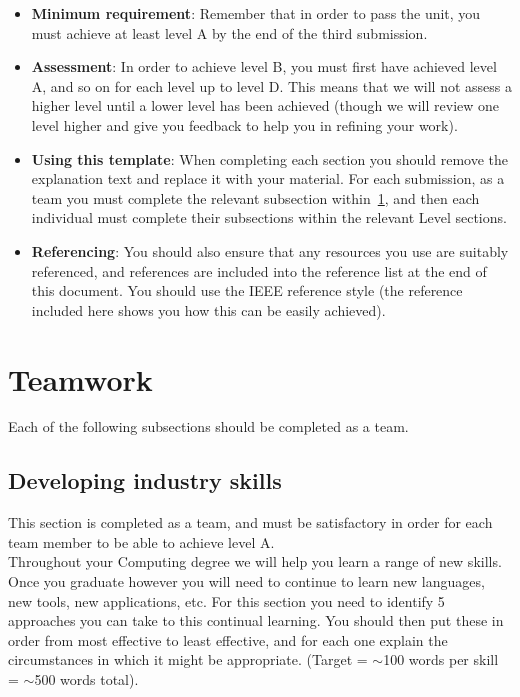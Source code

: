 \documentclass[a4paper, 11pt]{report}
\begin{document}
\begin{itemize}
	\item \textbf{Minimum requirement}: Remember that in order to pass the unit, you must achieve at least level A by the end of the third submission.
	\item \textbf{Assessment}: In order to achieve level B, you must first have achieved level A, and so on for each level up to level D. This means that we will not assess a higher level until a lower level has been achieved (though we will review one level higher and give you feedback to help you in refining your work).
	\item \textbf{Using this template}: When completing each section you should remove the explanation text and replace it with your material. For each submission, as a team you must complete the relevant subsection within~\ref{sect-team}, and then each individual must complete their subsections within the relevant Level sections.
	\item \textbf{Referencing}: You should also ensure that any resources you use are suitably referenced, and references are included into the reference list at the end of this document. You should use the IEEE reference style \cite{usyd2} (the reference included here shows you how this can be easily achieved).
\end{itemize}



\newpage
\section{Teamwork}
\label{sect-team}

Each of the following subsections should be completed as a team.

\subsection{Developing industry skills}

This section is completed as a team, and must be satisfactory in order for each team member to be able to achieve level A.\\
Throughout your Computing degree we will help you learn a range of new skills. Once you graduate however you will need to continue to learn new languages, new tools, new applications, etc. For this section you need to identify 5 approaches you can take to this continual learning. You should then put these in order from most effective to least effective, and for each one explain the circumstances in which it might be appropriate. (Target = $\sim$100 words per skill = $\sim$500 words total).
\end{document}
